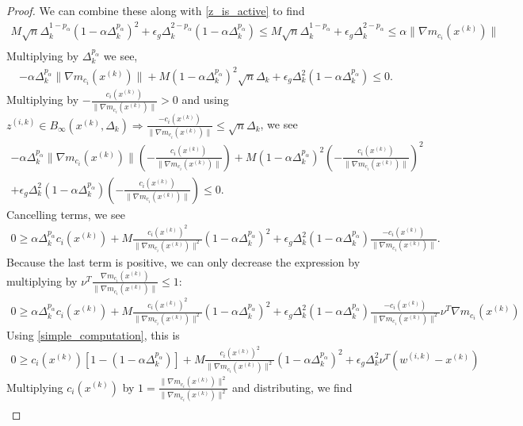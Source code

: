 \documentclass{article}
\theoremstyle{case}
\newcommand{\xk}{{x^{(k)}}}
\newcommand{\dk}{\Delta_k}
\newcommand{\zik}{{z^{(i, k)}}}
\newcommand{\wik}{{w^{(i, k)}}}
\newcommand{\gmcik}{{\nabla m_{c_i}(\xk)}}
\newcommand{\tr}{{ B_{\infty}\left(\xk, \dk\right) }}
\begin{document}
\begin{proof}
We can combine these along with \cref{z_is_active} to find 
\begin{align*}
M \sqrt{n}\dk^{1-p_{\alpha}}\left(1 - \alpha \dk^{p_{\alpha}}\right)^2  + \epsilon_g \dk^{2 - p_{\alpha}} \left(1 - \alpha \dk^{p_{\alpha}}\right)
\le M \sqrt{n}\dk^{1 - p_{\alpha}} + \epsilon_g \dk^{2 - p_{\alpha}} \le \alpha \|\gmcik\| \\
\end{align*}
Multiplying by $\dk^{p_{\alpha}}$ we see,
\begin{align*}
-\alpha \dk^{p_{\alpha}}\|\gmcik\| + M \left(1 - \alpha \dk^{p_{\alpha}}\right)^2 \sqrt{n}\dk+ \epsilon_g \dk^2 \left(1 - \alpha \dk^{p_{\alpha}}\right) \le  0.
\end{align*}
Multiplying by $-\frac{c_i(\xk)}{\|\gmcik\|} > 0$ and using $\zik \in \tr \Longrightarrow \frac{-c_i(\xk)}{\|\gmcik\|} \le \sqrt{n}\dk$, we see
\begin{align*}
-\alpha \dk^{p_{\alpha}}\|\gmcik\|\left(-\frac{c_i(\xk)}{\|\gmcik\|}\right) + M \left(1 - \alpha \dk^{p_{\alpha}}\right)^2 \left(-\frac{c_i(\xk)}{\|\gmcik\|}\right)^2\\
+\epsilon_g \dk^2 \left(1 - \alpha \dk^{p_{\alpha}}\right)\left(-\frac{c_i(\xk)}{\|\gmcik\|}\right) \le 0.
\end{align*}
Cancelling terms, we see
\begin{align*}
0 \ge \alpha \dk^{p_{\alpha}} c_i(\xk) + M \frac {c_i(\xk)^2}{\|\gmcik\|^2}\left(1 - \alpha \dk^{p_{\alpha}}\right)^2 + \epsilon_g \dk^2 \left(1 - \alpha \dk^{p_{\alpha}}\right)\frac{-c_i(\xk)}{\|\gmcik\|}.
\end{align*}
Because the last term is positive, we can only decrease the expression by multiplying by $\nu^T \frac{\gmcik}{\|\gmcik\|} \le 1$:
\begin{align*}
0\ge \alpha \dk^{p_{\alpha}} c_i(\xk) + M \frac {c_i(\xk)^2}{\|\gmcik\|^2}\left(1 - \alpha \dk^{p_{\alpha}}\right)^2 + \epsilon_g \dk^2 \left(1 - \alpha \dk^{p_{\alpha}}\right)\frac{-c_i(\xk)}{\|\gmcik\|^2}\nu^T\gmcik
\end{align*}
Using \cref{simple_computation}, this is
\begin{align*}
0 \ge c_i(\xk)\left[1 - \left(1 - \alpha \dk^{p_{\alpha}}\right)\right] + M \frac {c_i(\xk)^2}{\|\gmcik\|^2}\left(1 - \alpha \dk^{p_{\alpha}}\right)^2 + \epsilon_g \dk^2\nu^T \left(\wik - \xk\right)
\end{align*}
Multiplying $c_i(\xk)$ by $1 = \frac{\|\gmcik\|^2}{\|\gmcik\|^2}$ and distributing, we find
\begin{align*}

\end{align*}
\end{proof}
\end{document}
